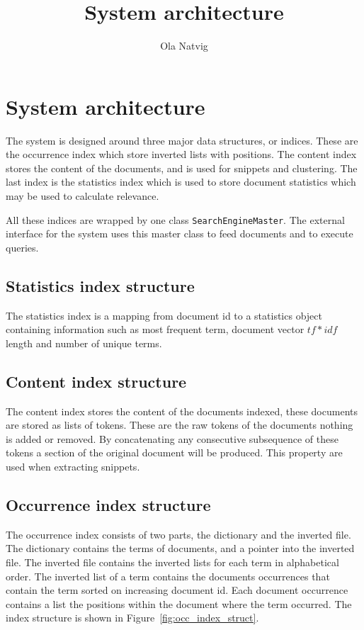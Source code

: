 \documentclass[]{article}
\title{System architecture}
\author{Ola Natvig}
\begin{document}
\maketitle
\section{System architecture}
The system is designed around three major data structures, or indices. These are the occurrence index which store inverted lists with positions. The content index stores the content of the documents, and is used for snippets and clustering. The last index is the statistics index which is used to store document statistics which may be used to calculate relevance. 

All these indices are wrapped by one class \texttt{SearchEngineMaster}. The external interface for the system uses this master class to feed documents and to execute queries.  

\subsection{Statistics index structure}\label{sub:statistics_index_structure}
The statistics index is a mapping from document id to a statistics object containing information such as most frequent term, document vector $tf*idf$ length and number of unique terms.

\subsection{Content index structure}\label{sub:content_index_structure}
The content index stores the content of the documents indexed, these documents are stored as lists of tokens. These are the raw tokens of the documents nothing is added or removed. By concatenating any consecutive subsequence of these tokens a section of the original document will be produced. This property are used when extracting snippets.  

\subsection{Occurrence index structure}\label{sub:occurrence_index_structure}
The occurrence index consists of two parts, the dictionary and the inverted file. The dictionary contains the terms of documents, and a pointer into the inverted file. The inverted file contains the inverted lists for each term in alphabetical order. The inverted list of a term contains the documents occurrences that contain the term sorted on increasing document id. Each document occurrence contains a list the positions within the document where the term occurred. The index structure is shown in Figure~\ref{fig:occ_index_struct}.
\end{document}

